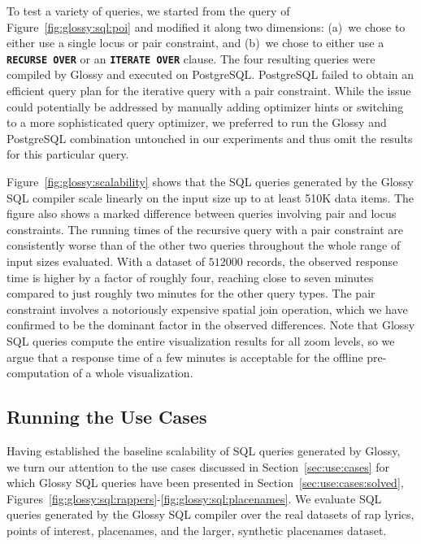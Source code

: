 \documentclass[11pt, oneside]{report}
\begin{document}
To test a variety of queries, we started from the query of Figure~\ref{fig:glossy:sql:poi} and modified it along two dimensions: (a)~we chose to either use a single locus or pair constraint, and (b)~we chose to either use a \textbf{\texttt{RECURSE OVER}} or an \textbf{\texttt{ITERATE OVER}} clause. The four resulting queries were compiled by Glossy and executed on PostgreSQL. PostgreSQL failed to obtain an efficient query plan for the iterative query with a pair constraint. While the issue could potentially be addressed by manually adding optimizer hints or switching to a more sophisticated query optimizer, we preferred to  run the Glossy and PostgreSQL combination untouched in our experiments and thus omit the results for this particular query. 

Figure~\ref{fig:glossy:scalability} shows that the SQL queries generated by the Glossy SQL compiler scale linearly on the input size up to at least 510K data items. The figure also shows a marked difference between queries involving pair and locus constraints. The running times of the recursive query with a pair constraint are consistently worse than of the other two queries throughout the whole range of input sizes evaluated. With a dataset of $512000$ records, the observed response time is higher by a factor of roughly four, reaching close to seven minutes compared to just roughly two minutes for the other query types. The pair constraint involves a notoriously expensive spatial join operation, which we have confirmed to be the dominant factor in the observed differences. Note that Glossy SQL queries compute the entire visualization results for all zoom levels, so we argue that a response time of a few minutes is acceptable for the offline pre-computation of a whole visualization.     


\subsection{Running the Use Cases}

Having established the baseline scalability of SQL queries generated by Glossy, we turn our attention to the use cases discussed in Section~\ref{sec:use:cases} for which Glossy SQL queries have been presented in Section~\ref{sec:use:cases:solved}, Figures~\ref{fig:glossy:sql:rappers}-\ref{fig:glossy:sql:placenames}. We evaluate SQL queries generated by the Glossy SQL compiler over the real datasets of rap lyrics, points of interest, placenames, and the larger, synthetic placenames dataset. 
\end{document}
